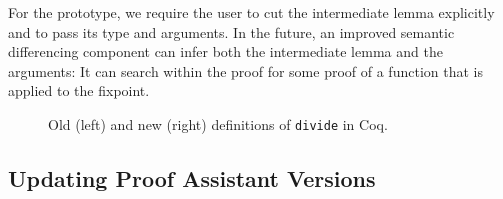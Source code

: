 For the prototype, we require the user to cut the intermediate lemma explicitly and to 
pass its type and arguments. %
In the future, an improved semantic differencing component
can infer both the intermediate lemma and the arguments: It can search
within the proof for some proof of a function that is applied
to the fixpoint.




\begin{figure*}[ht]
\begin{minipage}{0.48\textwidth}
\lstset{language=coq, aboveskip=0pt,belowskip=0pt}

\end{minipage}
\hfill
\begin{minipage}{0.48\textwidth}
\lstset{language=coq, aboveskip=0pt,belowskip=0pt}

\end{minipage}
\vspace{-.3cm}
\caption[Caption for LOF]{Old (left) and new (right) definitions of \lstinline{divide} in Coq.}
\label{fig:divide}
\end{figure*}

\lstset{language=coq, aboveskip=3pt,belowskip=3pt}

\subsection{Updating Proof Assistant Versions}
\label{sec:coq}

